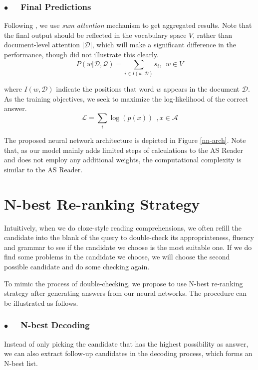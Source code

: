 \documentclass[11pt,a4paper]{article}
\begin{document}
\subsubsection*{$\bullet$~~ Final Predictions}
Following , we use {\em sum attention} mechanism to get aggregated results. Note that the final output should be reflected in the vocabulary space $V$, rather than document-level attention $|\mathcal D|$, which will make a significant difference in the performance, though  did not illustrate this clearly. 
\begin{equation} P(w|\mathcal D, \mathcal Q) = \sum_{i \in I(w,\mathcal D)} s_i  ,~~w \in V \end{equation}

where $I(w,\mathcal D)$ indicate the positions that word $w$ appears in the document $\mathcal D$. 
As the training objectives, we seek to maximize the log-likelihood of the correct answer.
\begin{equation} \mathcal{L} = \sum_{i} \log(p(x))~~, x\in\mathcal{A}\end{equation}

The proposed neural network architecture is depicted in Figure \ref{nn-arch}.
Note that, as our model mainly adds limited steps of calculations to the AS Reader \cite{kadlec-etal-2016} and does not employ any additional weights, the computational complexity is similar to the AS Reader. 

        
\section{N-best Re-ranking Strategy}\label{reranking}

Intuitively, when we do cloze-style reading comprehensions, we often refill the candidate into the blank of the query to double-check its appropriateness, fluency and grammar to see if the candidate we choose is the most suitable one. If we do find some problems in the candidate we choose, we will choose the second possible candidate and do some checking again.

To mimic the process of double-checking, we propose to use N-best re-ranking strategy after generating answers from our neural networks. 
The procedure can be illustrated as follows.

\subsubsection*{$\bullet$~~ N-best Decoding}
Instead of only picking the candidate that has the highest possibility as answer, we can also extract follow-up candidates in the decoding process, which forms an N-best list.
\end{document}
